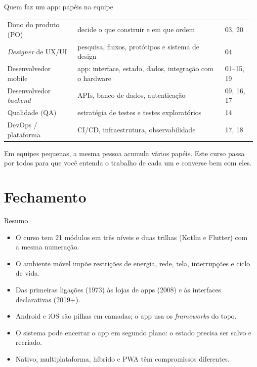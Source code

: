 \documentclass[aspectratio=169,10pt]{beamer}
\begin{document}
\begin{frame}{Quem faz um app: papéis na equipe}
  \scriptsize
  \begin{tabularx}{\textwidth}{@{}p{3.2cm} L p{2.4cm}@{}}
    \toprule
     &  &  \\
    \midrule
    Dono do produto (PO) & decide o que construir e em que ordem & 03, 20 \\
    \emph{Designer} de UX/UI & pesquisa, fluxos, protótipos e sistema de design & 04 \\
    Desenvolvedor mobile & app: interface, estado, dados, integração com o hardware & 01--15, 19 \\
    Desenvolvedor \emph{backend} & APIs, banco de dados, autenticação & 09, 16, 17 \\
    Qualidade (QA) & estratégia de testes e testes exploratórios & 14 \\
    DevOps / plataforma & CI/CD, infraestrutura, observabilidade & 17, 18 \\
    \bottomrule
  \end{tabularx}
  \vspace{4pt}
  \begin{dica}
    Em equipes pequenas, a mesma pessoa acumula vários papéis. Este curso passa por todos para que você entenda o trabalho de cada um e converse bem com eles.
  \end{dica}
\end{frame}

\section{Fechamento}

\begin{frame}{Resumo}
  \begin{resumo}
    \begin{itemize}
      \item O curso tem 21 módulos em três níveis e duas trilhas (Kotlin e Flutter) com a mesma numeração.
      \item O ambiente móvel impõe restrições de energia, rede, tela, interrupções e ciclo de vida.
      \item Das primeiras ligações (1973) às lojas de apps (2008) e às interfaces declarativas (2019+).
      \item Android e iOS são pilhas em camadas; o app usa os \emph{frameworks} do topo.
      \item O sistema pode encerrar o app em segundo plano: o estado precisa ser salvo e recriado.
      \item Nativo, multiplataforma, híbrido e PWA têm compromissos diferentes.
    \end{itemize}
  \end{resumo}
\end{frame}
\end{document}
